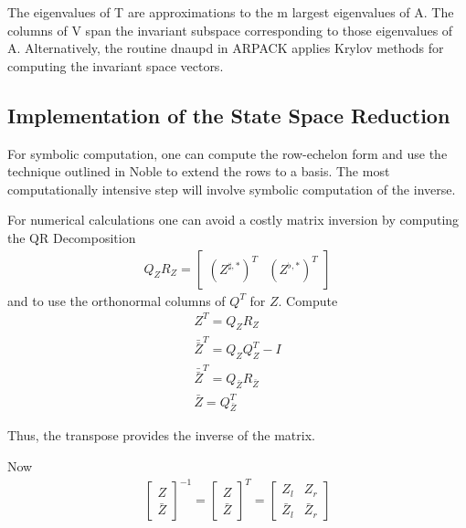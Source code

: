 \documentclass{article}
\begin{document}
{The eigenvalues of T are approximations to the m largest eigenvalues of A.
The columns of V span the invariant subspace corresponding 
to those eigenvalues of A.
Alternatively, the routine dnaupd in ARPACK applies Krylov methods for computing
the invariant space vectors.



\subsection{Implementation of the State Space Reduction}

 

For symbolic computation, one can compute the row-echelon form and use the
technique outlined in Noble to extend the rows to a basis. The most computationally intensive step will involve symbolic computation of the inverse.






For numerical calculations one can avoid a costly matrix inversion
by computing the QR Decomposition
\begin{gather*}
Q_Z R_Z=\begin{bmatrix}
(Z^{\sharp,\ast})^T  &(Z^{\flat,\ast})^T  
\end{bmatrix}
\end{gather*}
and to use the orthonormal columns of $Q^T$ for $Z$.
Compute
\begin{gather*}
  Z^T = Q_Z R_Z\\
\bar{\bar{Z}}^T = Q_Z Q_Z^T - I\\
\bar{\bar{Z}}^T=Q_{\bar{Z}} R_{\bar{Z}}\\
\bar{Z}=Q_{\bar{Z}}^T
\end{gather*}

Thus, the transpose provides the inverse of the matrix.

Now 
\begin{gather*}
    \begin{bmatrix}
    Z \\ \bar{Z}
  \end{bmatrix}
^{-1} =     \begin{bmatrix}
    Z \\ \bar{Z}
  \end{bmatrix}
^T= 
  \begin{bmatrix}
    Z_l&Z_r\\
\bar{Z}_l&\bar{Z}_r
  \end{bmatrix} 
\end{gather*}




}
\end{document}
